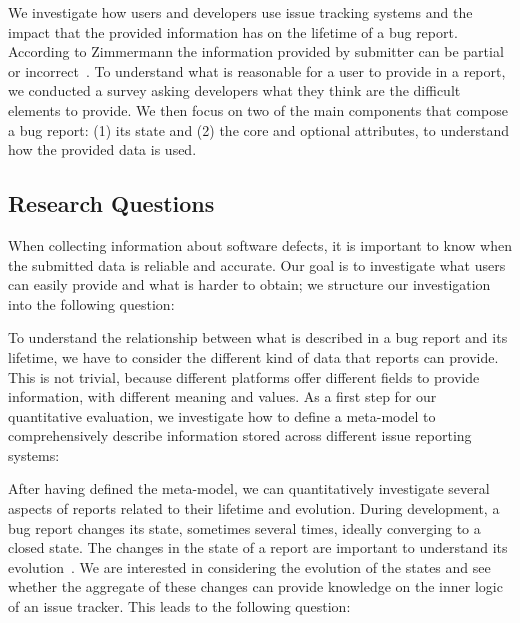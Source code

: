 We investigate how users and developers use issue tracking systems and the impact that the provided information has on the lifetime of a bug report.
According to Zimmermann \etal the information provided by submitter can be partial or incorrect~\cite{Zimm2010a}.
To understand what is reasonable for a user to provide in a report, we conducted a survey asking developers what they think are the difficult elements to provide.
We then focus on two of the main components that compose a bug report: (1) its state and (2) the core and optional attributes, to understand how the provided data is used.

\subsection{Research Questions} \label{sec:model-questions}

When collecting information about software defects, it is important to know when the submitted data is reliable and accurate.
Our goal is to investigate what  users can easily provide and what is harder to obtain; we structure our investigation into the following question:


To understand the relationship between what is described in a bug report and its lifetime, we have to consider the different kind of data that reports can provide.
This is not trivial, because different platforms offer different fields to provide information, with different meaning and values.
As a first step for our quantitative evaluation, we investigate how to define a meta-model to comprehensively describe information stored across different issue reporting systems:


After having defined the meta-model, we can quantitatively investigate several aspects of reports related to their lifetime and evolution.
During development, a bug report changes its state, sometimes several times, ideally converging to a closed state.
The changes in the state of a report are important to understand its evolution~\cite{DAmb2007b}.
We are interested in considering the evolution of the states and see whether the aggregate of these changes can provide knowledge on the inner logic of an issue tracker.
This leads to the following question:

